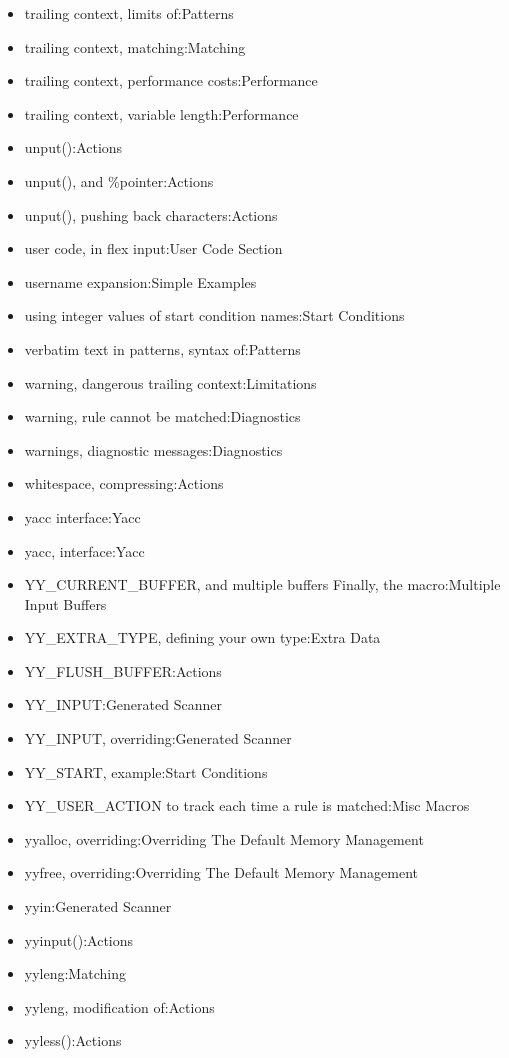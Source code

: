 \documentclass[openany,oneside]{book}
\begin{document}
\begin{itemize}
\item trailing context, limits of:Patterns
\item trailing context, matching:Matching
\item trailing context, performance costs:Performance
\item trailing context, variable length:Performance
\item unput():Actions
\item unput(), and \%{}pointer:Actions
\item unput(), pushing back characters:Actions
\item user code, in flex input:User Code Section
\item username expansion:Simple Examples
\item using integer values of start condition names:Start Conditions
\item verbatim text in patterns, syntax of:Patterns
\item warning, dangerous trailing context:Limitations
\item warning, rule cannot be matched:Diagnostics
\item warnings, diagnostic messages:Diagnostics
\item whitespace, compressing:Actions
\item yacc interface:Yacc
\item yacc, interface:Yacc
\item YY\_{}CURRENT\_{}BUFFER, and multiple buffers Finally, the macro:Multiple Input Buffers
\item YY\_{}EXTRA\_{}TYPE, defining your own type:Extra Data
\item YY\_{}FLUSH\_{}BUFFER:Actions
\item YY\_{}INPUT:Generated Scanner
\item YY\_{}INPUT, overriding:Generated Scanner
\item YY\_{}START, example:Start Conditions
\item YY\_{}USER\_{}ACTION to track each time a rule is matched:Misc Macros
\item yyalloc, overriding:Overriding The Default Memory Management
\item yyfree, overriding:Overriding The Default Memory Management
\item yyin:Generated Scanner
\item yyinput():Actions
\item yyleng:Matching
\item yyleng, modification of:Actions
\item yyless():Actions

\end{itemize}
\end{document}
